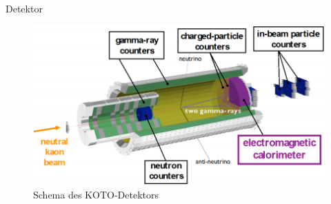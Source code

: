 \documentclass[aspectratio=1610, professionalfonts, 9pt, t]{beamer}
\begin{document}
  \begin{frame}{Detektor}
    \begin{figure}[ht]
      \begin{center}
        \includegraphics[height=0.8\textheight]{Images/jparcdetektor.png}
        \caption{Schema des KOTO-Detektors} %
      \end{center}
    \end{figure}
  \end{frame}
\end{document}
